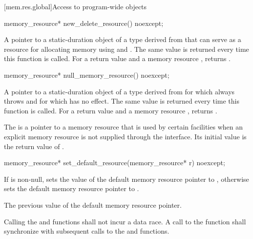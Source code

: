 [mem.res.global]{Access to program-wide  objects}

%
\begin{itemdecl}
memory_resource* new_delete_resource() noexcept;
\end{itemdecl}

\begin{itemdescr}
\pnum
\returns
A pointer to a static-duration object of a type derived from 
that can serve as a resource for allocating memory
using  and .
The same value is returned every time this function is called.
For a return value  and a memory resource ,
 returns .
\end{itemdescr}

%
\begin{itemdecl}
memory_resource* null_memory_resource() noexcept;
\end{itemdecl}

\begin{itemdescr}
\pnum
\returns
A pointer to a static-duration object of a type derived from 
for which  always throws  and
for which  has no effect.
The same value is returned every time this function is called.
For a return value  and a memory resource ,
 returns .
\end{itemdescr}

\pnum
The  is a pointer to a memory resource
that is used by certain facilities when an explicit memory resource
is not supplied through the interface.
Its initial value is the return value of .

%
\begin{itemdecl}
memory_resource* set_default_resource(memory_resource* r) noexcept;
\end{itemdecl}

\begin{itemdescr}
\pnum
\effects
If  is non-null,
sets the value of the default memory resource pointer to ,
otherwise sets the default memory resource pointer to .

\pnum
\returns
The previous value of the default memory resource pointer.

\pnum
\remarks
Calling the  and
 functions shall not incur a data race.
A call to the  function
shall synchronize with subsequent calls to
the  and  functions.
\end{itemdescr}

